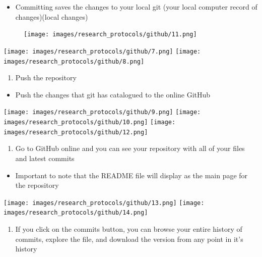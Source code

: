 \documentclass[
]{book}
\providecommand{\tightlist}{%
  \setlength{\itemsep}{0pt}\setlength{\parskip}{0pt}}
\begin{document}
\begin{itemize}
\tightlist
\item
  Committing saves the changes to your local git (your local computer record of changes)(local changes)
\end{itemize}

\begin{figure}
\centering
\texttt{[image: images/research\_protocols/github/11.png]}
\caption{}
\end{figure}

\texttt{[image: images/research\_protocols/github/7.png]}
\texttt{[image: images/research\_protocols/github/8.png]}

\begin{enumerate}
\def\labelenumi{\arabic{enumi}.}
\setcounter{enumi}{7}
\tightlist
\item
  Push the repository
\end{enumerate}

\begin{itemize}
\tightlist
\item
  Push the changes that git has catalogued to the online GitHub
\end{itemize}

\texttt{[image: images/research\_protocols/github/9.png]}
\texttt{[image: images/research\_protocols/github/10.png]}
\texttt{[image: images/research\_protocols/github/12.png]}

\begin{enumerate}
\def\labelenumi{\arabic{enumi}.}
\setcounter{enumi}{8}
\tightlist
\item
  Go to GitHub online and you can see your repository with all of your files and latest commits
\end{enumerate}

\begin{itemize}
\tightlist
\item
  Important to note that the README file will display as the main page for the repository
\end{itemize}

\texttt{[image: images/research\_protocols/github/13.png]}
\texttt{[image: images/research\_protocols/github/14.png]}

\begin{enumerate}
\def\labelenumi{\arabic{enumi}.}
\setcounter{enumi}{9}
\tightlist
\item
  If you click on the commits button, you can browse your entire history of commits, explore the file, and download the version from any point in it's history
\end{enumerate}
\end{document}
